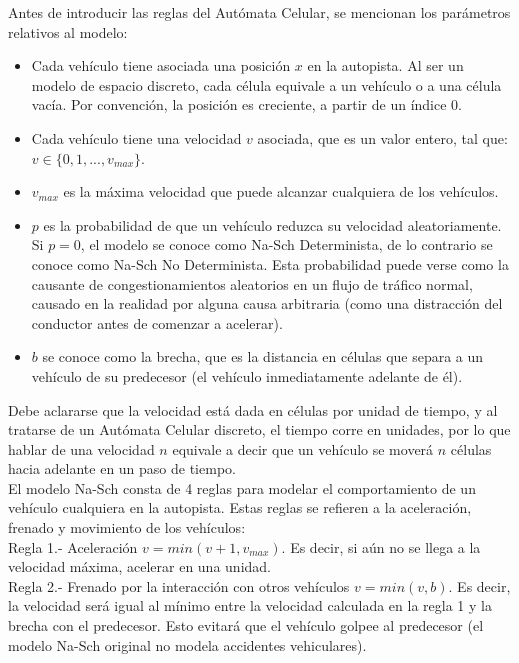 Antes de introducir las reglas del Autómata Celular, se mencionan los parámetros relativos al modelo:
\begin{itemize}
\item Cada vehículo tiene asociada una posición $x$ en la autopista. Al ser un modelo de espacio discreto, cada célula equivale a un vehículo o a una célula vacía. Por convención, la posición es creciente, a partir de un índice 0.
\item  Cada vehículo tiene una velocidad $v$ asociada, que es un valor entero, tal que: $v \in \lbrace 0,1,...,v_{max} \rbrace$.
\item $v_{max}$ es la máxima velocidad que puede alcanzar cualquiera de los vehículos.
\item $p$ es la probabilidad de que un vehículo reduzca su velocidad aleatoriamente. Si $p=0$, el modelo se conoce como Na-Sch Determinista, de lo contrario se conoce como Na-Sch No Determinista. Esta probabilidad puede verse como la causante de congestionamientos aleatorios en un flujo de tráfico normal, causado en la realidad por alguna causa arbitraria (como una distracción del conductor antes de comenzar a acelerar).
\item  $b$ se conoce como la brecha, que es la distancia en células que separa a un vehículo de su predecesor (el vehículo inmediatamente adelante de él).
\end{itemize}

Debe aclararse que la velocidad está dada en células por unidad de tiempo, y al tratarse de un Autómata Celular discreto, el tiempo corre en unidades, por lo que hablar de una velocidad $n$ equivale a decir que un vehículo se moverá $n$ células hacia adelante en un paso de tiempo.\\

El modelo Na-Sch consta de 4 reglas para modelar el comportamiento de un vehículo cualquiera en la autopista. Estas reglas se refieren a la aceleración, frenado y movimiento de los vehículos:\\


Regla 1.- Aceleración $ v=min(v+1,v_{max})$. Es decir, si aún no se llega a la velocidad máxima, acelerar en una unidad.\\

Regla 2.- Frenado por la interacción con otros vehículos $v=min(v,b)$. Es decir, la velocidad será igual al mínimo entre la velocidad calculada en la regla 1 y la brecha con el predecesor. Esto evitará que el vehículo golpee al predecesor (el modelo Na-Sch original no modela accidentes vehiculares).\\


